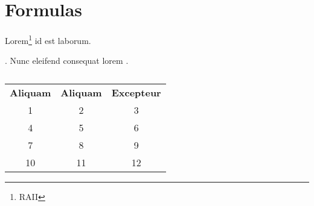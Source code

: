 \section{Formulas}

\lipsum[2][1-4] Lorem\footnote{\gls{RAII}} id est laborum.

\lipsum[3]. Nunc eleifend consequat lorem .

\begin{table}[ht]
    \centering
    \begin{tabular}{ccc}
        \textbf{Aliquam} & \textbf{Aliquam} & \textbf{Excepteur} \\
        1                & 2                & 3                  \\
        4                & 5                & 6                  \\
        7                & 8                & 9                  \\
        10               & 11               & 12
    \end{tabular}
    \caption{\lipsum[1][1]}\label{tab:test}
\end{table}

